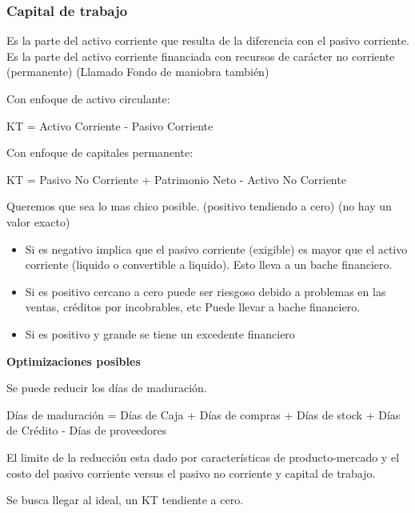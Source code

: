\documentclass[titlepage,a4paper]{article}
\begin{document}
\subsubsection*{Capital de trabajo}
Es la parte del activo corriente que resulta de la diferencia con el pasivo corriente. Es la parte del activo corriente financiada con recursos de carácter no corriente (permanente) (Llamado Fondo de maniobra también)

\medskip
Con enfoque de activo circulante:
\begin{center}
    KT = Activo Corriente - Pasivo Corriente
\end{center}

\medskip
Con enfoque de capitales permanente:
\begin{center}
    KT = Pasivo No Corriente + Patrimonio Neto - Activo No Corriente
\end{center}

\medskip
Queremos que sea lo mas chico posible. (positivo tendiendo a cero) (no hay un valor exacto)
\begin{itemize}
    \item Si es negativo implica que el pasivo corriente (exigible) es mayor que el activo corriente (liquido o convertible a liquido). Esto lleva a un bache financiero.
    \item Si es positivo cercano a cero puede ser riesgoso debido a problemas en las ventas, créditos por incobrables, etc Puede llevar a bache financiero.
    \item Si es positivo y grande se tiene un excedente financiero
\end{itemize}

\medskip
\textbf{Optimizaciones posibles}

\medskip
Se puede reducir los días de maduración.
\begin{center}
Días de maduración = Días de Caja + Días de compras + Días de stock + Días de Crédito - Días de proveedores
\end{center}

\medskip
El limite de la reducción esta dado por características de producto-mercado y el costo del pasivo corriente versus el pasivo no corriente y capital de trabajo.

Se busca llegar al ideal, un KT tendiente a cero.
\end{document}

